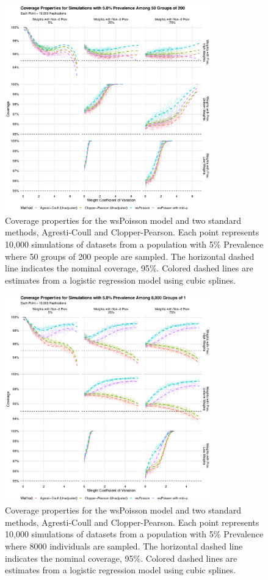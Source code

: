 \documentclass[AMA,STIX1COL]{WileyNJD-v2}
\begin{document}
\begin{figure}
\centering
\includegraphics[width=0.8\textwidth]{figures/perfect_coverage_50_groups_0_05_prev.pdf}
\caption{Coverage properties for the wsPoisson model and two standard methods, Agresti-Coull and Clopper-Pearson.
Each point represents 10,000 simulations of datasets from a population with 5\% Prevalence where 50 groups of 200 people are sampled.
The horizontal dashed line indicates the nominal coverage, 95\%.
Colored dashed lines are estimates from a logistic regression model using cubic splines.}
\label{fig:perfect_coverage_50_groups_0_05_prev}
\end{figure}

\begin{figure}
\centering
\includegraphics[width=0.8\textwidth]{figures/perfect_coverage_8000_groups_0_05_prev.pdf}
\caption{Coverage properties for the wsPoisson model and two standard methods, Agresti-Coull and Clopper-Pearson.
Each point represents 10,000 simulations of datasets from a population with 5\% Prevalence where 8000 individuals are sampled.
The horizontal dashed line indicates the nominal coverage, 95\%.
Colored dashed lines are estimates from a logistic regression model using cubic splines.}
\label{fig:perfect_coverage_8000_groups_0_05_prev}
\end{figure}
\end{document}
